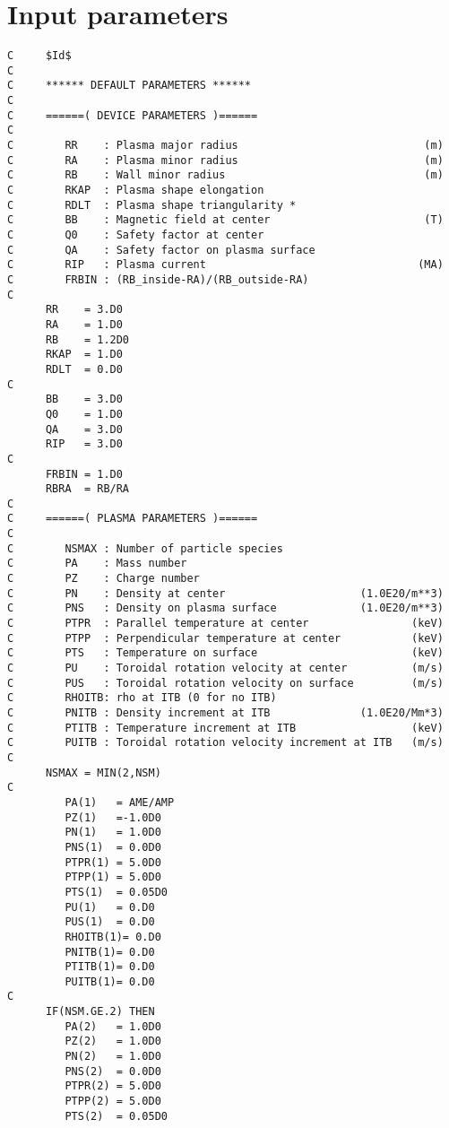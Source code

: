 \documentclass[11pt]{article}
\begin{document}
\section{Input parameters}

{\footnotesize
\begin{verbatim}
C     $Id$
C
C     ****** DEFAULT PARAMETERS ******
C
C     ======( DEVICE PARAMETERS )======
C
C        RR    : Plasma major radius                             (m)
C        RA    : Plasma minor radius                             (m)
C        RB    : Wall minor radius                               (m)
C        RKAP  : Plasma shape elongation
C        RDLT  : Plasma shape triangularity *
C        BB    : Magnetic field at center                        (T)
C        Q0    : Safety factor at center
C        QA    : Safety factor on plasma surface
C        RIP   : Plasma current                                 (MA)
C        FRBIN : (RB_inside-RA)/(RB_outside-RA)
C
      RR    = 3.D0
      RA    = 1.D0
      RB    = 1.2D0
      RKAP  = 1.D0
      RDLT  = 0.D0
C
      BB    = 3.D0
      Q0    = 1.D0
      QA    = 3.D0
      RIP   = 3.D0
C
      FRBIN = 1.D0
      RBRA  = RB/RA
C
C     ======( PLASMA PARAMETERS )======
C
C        NSMAX : Number of particle species
C        PA    : Mass number
C        PZ    : Charge number
C        PN    : Density at center                     (1.0E20/m**3)
C        PNS   : Density on plasma surface             (1.0E20/m**3)
C        PTPR  : Parallel temperature at center                (keV)
C        PTPP  : Perpendicular temperature at center           (keV)
C        PTS   : Temperature on surface                        (keV)
C        PU    : Toroidal rotation velocity at center          (m/s)
C        PUS   : Toroidal rotation velocity on surface         (m/s)
C        RHOITB: rho at ITB (0 for no ITB)
C        PNITB : Density increment at ITB              (1.0E20/Mm*3)
C        PTITB : Temperature increment at ITB                  (keV)
C        PUITB : Toroidal rotation velocity increment at ITB   (m/s)
C
      NSMAX = MIN(2,NSM)
C
         PA(1)   = AME/AMP
         PZ(1)   =-1.0D0
         PN(1)   = 1.0D0
         PNS(1)  = 0.0D0
         PTPR(1) = 5.0D0
         PTPP(1) = 5.0D0
         PTS(1)  = 0.05D0
         PU(1)   = 0.D0
         PUS(1)  = 0.D0
         RHOITB(1)= 0.D0
         PNITB(1)= 0.D0
         PTITB(1)= 0.D0
         PUITB(1)= 0.D0
C
      IF(NSM.GE.2) THEN
         PA(2)   = 1.0D0
         PZ(2)   = 1.0D0
         PN(2)   = 1.0D0
         PNS(2)  = 0.0D0
         PTPR(2) = 5.0D0
         PTPP(2) = 5.0D0
         PTS(2)  = 0.05D0

\end{verbatim}}
\end{document}
